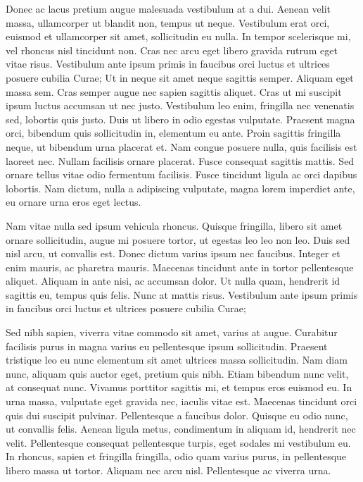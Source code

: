 Donec ac lacus pretium augue malesuada vestibulum at a dui.
Aenean velit massa, ullamcorper ut blandit non, tempus ut neque.
Vestibulum erat orci, euismod et ullamcorper sit amet, sollicitudin eu nulla.
In tempor scelerisque mi, vel rhoncus nisl tincidunt non.
Cras nec arcu eget libero gravida rutrum eget vitae risus.
Vestibulum ante ipsum primis in faucibus orci luctus et ultrices posuere cubilia Curae; Ut in neque sit amet neque sagittis semper.
Aliquam eget massa sem.
Cras semper augue nec sapien sagittis aliquet.
Cras ut mi suscipit ipsum luctus accumsan ut nec justo.
Vestibulum leo enim, fringilla nec venenatis sed, lobortis quis justo.
Duis ut libero in odio egestas vulputate.
Praesent magna orci, bibendum quis sollicitudin in, elementum eu ante.
Proin sagittis fringilla neque, ut bibendum urna placerat et.
Nam congue posuere nulla, quis facilisis est laoreet nec.
Nullam facilisis ornare placerat.
Fusce consequat sagittis mattis.
Sed ornare tellus vitae odio fermentum facilisis.
Fusce tincidunt ligula ac orci dapibus lobortis.
Nam dictum, nulla a adipiscing vulputate, magna lorem imperdiet ante, eu ornare urna eros eget lectus.

Nam vitae nulla sed ipsum vehicula rhoncus.
Quisque fringilla, libero sit amet ornare sollicitudin, augue mi posuere tortor, ut egestas leo leo non leo.
Duis sed nisl arcu, ut convallis est.
Donec dictum varius ipsum nec faucibus.
Integer et enim mauris, ac pharetra mauris.
Maecenas tincidunt ante in tortor pellentesque aliquet.
Aliquam in ante nisi, ac accumsan dolor.
Ut nulla quam, hendrerit id sagittis eu, tempus quis felis.
Nunc at mattis risus.
Vestibulum ante ipsum primis in faucibus orci luctus et ultrices posuere cubilia Curae;

Sed nibh sapien, viverra vitae commodo sit amet, varius at augue.
Curabitur facilisis purus in magna varius eu pellentesque ipsum sollicitudin.
Praesent tristique leo eu nunc elementum sit amet ultrices massa sollicitudin.
Nam diam nunc, aliquam quis auctor eget, pretium quis nibh.
Etiam bibendum nunc velit, at consequat nunc.
Vivamus porttitor sagittis mi, et tempus eros euismod eu.
In urna massa, vulputate eget gravida nec, iaculis vitae est.
Maecenas tincidunt orci quis dui suscipit pulvinar.
Pellentesque a faucibus dolor.
Quisque eu odio nunc, ut convallis felis.
Aenean ligula metus, condimentum in aliquam id, hendrerit nec velit.
Pellentesque consequat pellentesque turpis, eget sodales mi vestibulum eu.
In rhoncus, sapien et fringilla fringilla, odio quam varius purus, in pellentesque libero massa ut tortor.
Aliquam nec arcu nisl.
Pellentesque ac viverra urna.

